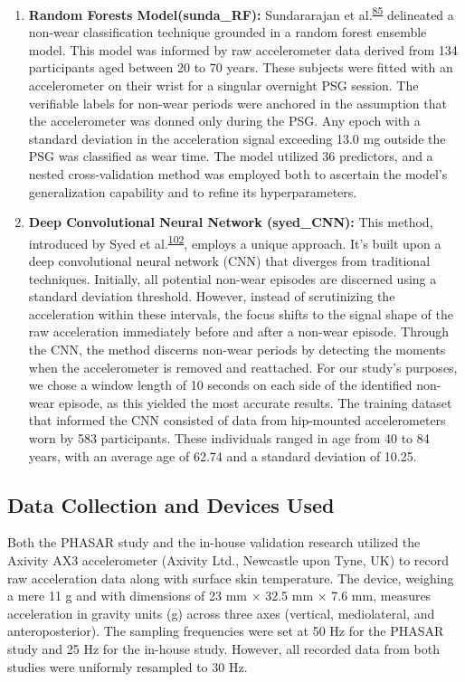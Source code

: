 \documentclass[
  10pt,
]{scrbook}
\begin{document}
\begin{enumerate}
\item
  \textsf{\textbf{Random Forests Model(sunda\_RF):}} Sundararajan et
  al.\textsuperscript{\protect\hyperlink{ref-sundararajan_sleep_2021}{85}}
  delineated a non-wear classification technique grounded in a random
  forest ensemble model. This model was informed by raw accelerometer
  data derived from 134 participants aged between 20 to 70 years. These
  subjects were fitted with an accelerometer on their wrist for a
  singular overnight PSG session. The verifiable labels for non-wear
  periods were anchored in the assumption that the accelerometer was
  donned only during the PSG. Any epoch with a standard deviation in the
  acceleration signal exceeding 13.0 mg outside the PSG was classified
  as wear time. The model utilized 36 predictors, and a nested
  cross-validation method was employed both to ascertain the model's
  generalization capability and to refine its hyperparameters.
\item
  \textsf{\textbf{Deep Convolutional Neural Network (syed\_CNN):}} This
  method, introduced by Syed et
  al.\textsuperscript{\protect\hyperlink{ref-syed_novel_2021}{102}},
  employs a unique approach. It's built upon a deep convolutional neural
  network (CNN) that diverges from traditional techniques. Initially,
  all potential non-wear episodes are discerned using a standard
  deviation threshold. However, instead of scrutinizing the acceleration
  within these intervals, the focus shifts to the signal shape of the
  raw acceleration immediately before and after a non-wear episode.
  Through the CNN, the method discerns non-wear periods by detecting the
  moments when the accelerometer is removed and reattached. For our
  study's purposes, we chose a window length of 10 seconds on each side
  of the identified non-wear episode, as this yielded the most accurate
  results. The training dataset that informed the CNN consisted of data
  from hip-mounted accelerometers worn by 583 participants. These
  individuals ranged in age from 40 to 84 years, with an average age of
  62.74 and a standard deviation of 10.25.
\end{enumerate}

\hypertarget{data-collection-and-devices-used}{%
\subsection{Data Collection and Devices
Used}\label{data-collection-and-devices-used}}

Both the PHASAR study and the in-house validation research utilized the
Axivity AX3 accelerometer (Axivity Ltd., Newcastle upon Tyne, UK) to
record raw acceleration data along with surface skin temperature. The
device, weighing a mere 11 g and with dimensions of 23 mm × 32.5 mm ×
7.6 mm, measures acceleration in gravity units (g) across three axes
(vertical, mediolateral, and anteroposterior). The sampling frequencies
were set at 50 Hz for the PHASAR study and 25 Hz for the in-house study.
However, all recorded data from both studies were uniformly resampled to
30 Hz.
\end{document}
